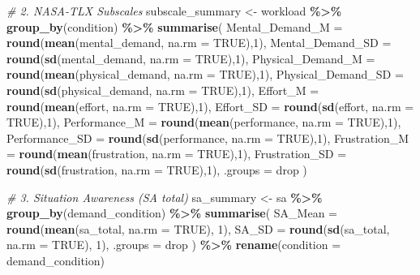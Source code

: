 \documentclass[
]{article}
\newenvironment{Shaded}{\begin{snugshade}}{\end{snugshade}}
\newcommand{\AttributeTok}[1]{\textcolor[rgb]{0.13,0.29,0.53}{#1}}
\newcommand{\CommentTok}[1]{\textcolor[rgb]{0.56,0.35,0.01}{\textit{#1}}}
\newcommand{\ConstantTok}[1]{\textcolor[rgb]{0.56,0.35,0.01}{#1}}
\newcommand{\DecValTok}[1]{\textcolor[rgb]{0.00,0.00,0.81}{#1}}
\newcommand{\FunctionTok}[1]{\textcolor[rgb]{0.13,0.29,0.53}{\textbf{#1}}}
\newcommand{\NormalTok}[1]{#1}
\newcommand{\OtherTok}[1]{\textcolor[rgb]{0.56,0.35,0.01}{#1}}
\newcommand{\SpecialCharTok}[1]{\textcolor[rgb]{0.81,0.36,0.00}{\textbf{#1}}}
\newcommand{\StringTok}[1]{\textcolor[rgb]{0.31,0.60,0.02}{#1}}
\begin{document}
\begin{Shaded}
\begin{Highlighting}[]
\CommentTok{\# 2. NASA{-}TLX Subscales}
\NormalTok{subscale\_summary }\OtherTok{\textless{}{-}}\NormalTok{ workload }\SpecialCharTok{\%\textgreater{}\%}
  \FunctionTok{group\_by}\NormalTok{(condition) }\SpecialCharTok{\%\textgreater{}\%}
  \FunctionTok{summarise}\NormalTok{(}
    \AttributeTok{Mental\_Demand\_M =} \FunctionTok{round}\NormalTok{(}\FunctionTok{mean}\NormalTok{(mental\_demand, }\AttributeTok{na.rm =} \ConstantTok{TRUE}\NormalTok{),}\DecValTok{1}\NormalTok{),}
    \AttributeTok{Mental\_Demand\_SD =} \FunctionTok{round}\NormalTok{(}\FunctionTok{sd}\NormalTok{(mental\_demand, }\AttributeTok{na.rm =} \ConstantTok{TRUE}\NormalTok{),}\DecValTok{1}\NormalTok{),}
    \AttributeTok{Physical\_Demand\_M =} \FunctionTok{round}\NormalTok{(}\FunctionTok{mean}\NormalTok{(physical\_demand, }\AttributeTok{na.rm =} \ConstantTok{TRUE}\NormalTok{),}\DecValTok{1}\NormalTok{),}
    \AttributeTok{Physical\_Demand\_SD =} \FunctionTok{round}\NormalTok{(}\FunctionTok{sd}\NormalTok{(physical\_demand, }\AttributeTok{na.rm =} \ConstantTok{TRUE}\NormalTok{),}\DecValTok{1}\NormalTok{),}
    \AttributeTok{Effort\_M =} \FunctionTok{round}\NormalTok{(}\FunctionTok{mean}\NormalTok{(effort, }\AttributeTok{na.rm =} \ConstantTok{TRUE}\NormalTok{),}\DecValTok{1}\NormalTok{),}
    \AttributeTok{Effort\_SD =} \FunctionTok{round}\NormalTok{(}\FunctionTok{sd}\NormalTok{(effort, }\AttributeTok{na.rm =} \ConstantTok{TRUE}\NormalTok{),}\DecValTok{1}\NormalTok{),}
    \AttributeTok{Performance\_M =} \FunctionTok{round}\NormalTok{(}\FunctionTok{mean}\NormalTok{(performance, }\AttributeTok{na.rm =} \ConstantTok{TRUE}\NormalTok{),}\DecValTok{1}\NormalTok{),}
    \AttributeTok{Performance\_SD =} \FunctionTok{round}\NormalTok{(}\FunctionTok{sd}\NormalTok{(performance, }\AttributeTok{na.rm =} \ConstantTok{TRUE}\NormalTok{),}\DecValTok{1}\NormalTok{),}
    \AttributeTok{Frustration\_M =} \FunctionTok{round}\NormalTok{(}\FunctionTok{mean}\NormalTok{(frustration, }\AttributeTok{na.rm =} \ConstantTok{TRUE}\NormalTok{),}\DecValTok{1}\NormalTok{),}
    \AttributeTok{Frustration\_SD =} \FunctionTok{round}\NormalTok{(}\FunctionTok{sd}\NormalTok{(frustration, }\AttributeTok{na.rm =} \ConstantTok{TRUE}\NormalTok{),}\DecValTok{1}\NormalTok{),}
    \AttributeTok{.groups =} \StringTok{\textquotesingle{}drop\textquotesingle{}}
\NormalTok{  )}

\CommentTok{\# 3. Situation Awareness (SA total)}
\NormalTok{sa\_summary }\OtherTok{\textless{}{-}}\NormalTok{ sa }\SpecialCharTok{\%\textgreater{}\%}
  \FunctionTok{group\_by}\NormalTok{(demand\_condition) }\SpecialCharTok{\%\textgreater{}\%}
  \FunctionTok{summarise}\NormalTok{(}
    \AttributeTok{SA\_Mean =} \FunctionTok{round}\NormalTok{(}\FunctionTok{mean}\NormalTok{(sa\_total, }\AttributeTok{na.rm =} \ConstantTok{TRUE}\NormalTok{), }\DecValTok{1}\NormalTok{),}
    \AttributeTok{SA\_SD =} \FunctionTok{round}\NormalTok{(}\FunctionTok{sd}\NormalTok{(sa\_total, }\AttributeTok{na.rm =} \ConstantTok{TRUE}\NormalTok{), }\DecValTok{1}\NormalTok{),}
    \AttributeTok{.groups =} \StringTok{\textquotesingle{}drop\textquotesingle{}}
\NormalTok{  ) }\SpecialCharTok{\%\textgreater{}\%}
  \FunctionTok{rename}\NormalTok{(}\AttributeTok{condition =}\NormalTok{ demand\_condition)}


\end{Highlighting}
\end{Shaded}
\end{document}
